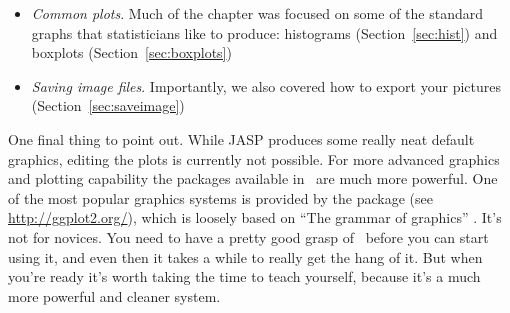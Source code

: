 \begin{itemize}
\item {\it Common plots}. Much of the chapter was focused on some of the standard graphs that statisticians like to produce: histograms (Section~\ref{sec:hist}) and boxplots (Section~\ref{sec:boxplots})
\item {\it Saving image files}. Importantly, we also covered how to export your pictures (Section~\ref{sec:saveimage})
\end{itemize} 

One final thing to point out. While JASP produces some really neat default graphics, editing the plots is currently not possible. For more advanced graphics and plotting capability the packages available in \R\ are much more powerful. One of the most popular graphics systems is provided by the  package (see \url{http://ggplot2.org/}), which is loosely based on ``The grammar of graphics'' \parencite{Wilkinson2006}. It's not for novices. You need to have a pretty good grasp of \R\ before you can start using it, and even then it takes a while to really get the hang of it. But when you're ready it's worth taking the time to teach yourself, because it's a much more powerful and cleaner system.





